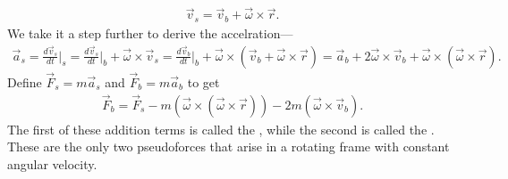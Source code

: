 \begin{align}
    \vec{v}_{s} = \vec{v}_{b} + \vec{\omega} \times \vec{r}.
\end{align}
We take it a step further to derive the accelration---
\begin{align}
    \vec{a}_{s} = \frac{d\vec{v}_{s}}{dt}\Big|_{s} = \frac{d\vec{v}_{s}}{dt}\Big|_{b} + \vec{\omega} \times \vec{v}_{s} = \frac{d\vec{v}_{b}}{dt}\Big|_{b} + \vec{\omega} \times (\vec{v}_{b} + \vec{\omega} \times \vec{r}) = \vec{a}_{b} + 2\vec{\omega} \times \vec{v}_{b} + \vec{\omega} \times (\vec{\omega} \times \vec{r}).
\end{align}
Define $\vec{F}_{s} = m\vec{a}_{s}$ and $\vec{F}_{b} = m\vec{a}_{b}$ to get
\begin{align}
    \vec{F}_{b} = \vec{F}_{s} - m(\vec{\omega} \times (\vec{\omega} \times \vec{r})) - 2m(\vec{\omega} \times \vec{v}_{b}).
\end{align}
The first of these addition terms is called the , while the second is called the . These are the only two pseudoforces that arise in a rotating frame with constant angular velocity. 

